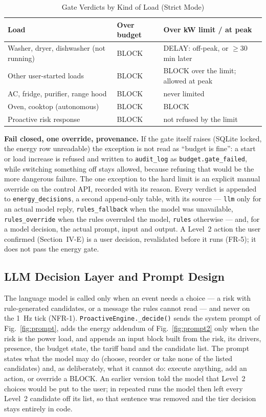 \documentclass[conference]{IEEEtran}
\begin{document}
\begin{table}[!t]
\caption{Gate Verdicts by Kind of Load (Strict Mode)}
\label{tab:verdicts}
\centering
\footnotesize
\begin{tabular}{p{2.7cm}p{2.3cm}p{2.3cm}}
\toprule
\textbf{Load} & \textbf{Over budget} & \textbf{Over kW limit / at peak} \\
\midrule
Washer, dryer, dishwasher (not running) & BLOCK & DELAY: off-peak, or $\geq$30 min later \\
Other user-started loads & BLOCK & BLOCK over the limit; allowed at peak \\
AC, fridge, purifier, range hood & BLOCK & never limited \\
Oven, cooktop (autonomous) & BLOCK & BLOCK \\
Proactive risk response & BLOCK & not refused by the limit \\
\bottomrule
\end{tabular}
\end{table}

\textbf{Fail closed, one override, provenance.} If the gate itself raises (SQLite locked, the energy row unreadable) the exception is not read as ``budget is fine'': a start or load increase is refused and written to \texttt{audit\_log} as \texttt{budget.gate\_failed}, while switching something off stays allowed, because refusing that would be the more dangerous failure. The one exception to the hard limit is an explicit manual override on the control API, recorded with its reason. Every verdict is appended to \texttt{energy\_decisions}, a second append-only table, with its source --- \texttt{llm} only for an actual model reply, \texttt{rules\_fallback} when the model was unavailable, \texttt{rules\_override} when the rules overruled the model, \texttt{rules} otherwise --- and, for a model decision, the actual prompt, input and output. A Level~2 action the user confirmed (Section~IV-E) is a user decision, revalidated before it runs (FR-5); it does not pass the energy gate.

\subsection{LLM Decision Layer and Prompt Design}
\label{sec:prompt}
The language model is called only when an event needs a choice --- a risk with rule-generated candidates, or a message the rules cannot read --- and never on the 1~Hz tick (NFR-1). \texttt{ProactiveEngine.\_decide()} sends the system prompt of Fig.~\ref{fig:prompt}, adds the energy addendum of Fig.~\ref{fig:prompt2} only when the risk is the power load, and appends an input block built from the risk, its drivers, presence, the budget state, the tariff band and the candidate list. The prompt states what the model may do (choose, reorder or take none of the listed candidates) and, as deliberately, what it cannot do: execute anything, add an action, or override a BLOCK. An earlier version told the model that Level~2 choices would be put to the user; in repeated runs the model then left every Level~2 candidate off its list, so that sentence was removed and the tier decision stays entirely in code.
\end{document}
